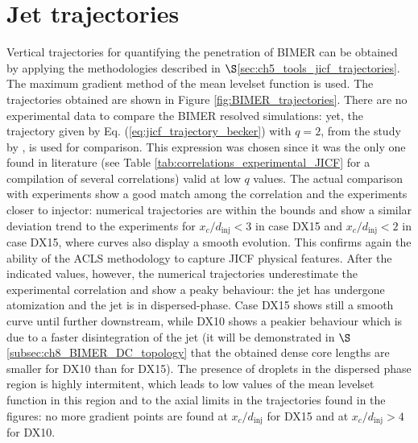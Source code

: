 \section{Jet trajectories}

Vertical trajectories for quantifying the penetration of BIMER can be obtained by applying the methodologies described in $\S$\ref{sec:ch5_tools_jicf_trajectories}. The maximum gradient method of the mean levelset function is used. The trajectories obtained are shown in Figure \ref{fig:BIMER_trajectories}. There are no experimental data to compare the BIMER resolved simulations: yet, the trajectory given by Eq. (\ref{eq:jicf_trajectory_becker}) with $q = 2$, from the study by , is used for comparison. This expression was chosen since it was the only one found in literature (see Table \ref{tab:correlations_experimental_JICF} for a compilation of several correlations) valid at low $q$ values. The actual comparison with experiments show a good match among the correlation and the experiments closer to injector: numerical trajectories are within the bounds and show a similar deviation trend to the experiments for $x_c/d_\mathrm{inj} < 3$ in case DX15 and $x_c/d_\mathrm{inj} < 2$ in case DX15, where curves also display a smooth evolution. This confirms again the ability of the ACLS methodology to capture JICF physical features. After the indicated values, however, the numerical trajectories underestimate the experimental correlation and show a peaky behaviour: the jet has undergone atomization and the jet is in dispersed-phase. Case DX15 shows still a smooth curve until further downstream, while DX10 shows a peakier behaviour which is due to a faster disintegration of the jet (it will be demonstrated in $\S$\ref{subsec:ch8_BIMER_DC_topology} that the obtained dense core lengths are smaller for DX10 than for DX15). The presence of droplets in the dispersed phase region is highly intermitent, which leads to low values of the mean levelset function in this region and to the axial limits in the trajectories found in the figures: no more gradient points are found at $x_c / d_\mathrm{inj}$ for DX15 and at $x_c / d_\mathrm{inj} > 4$ for DX10.


